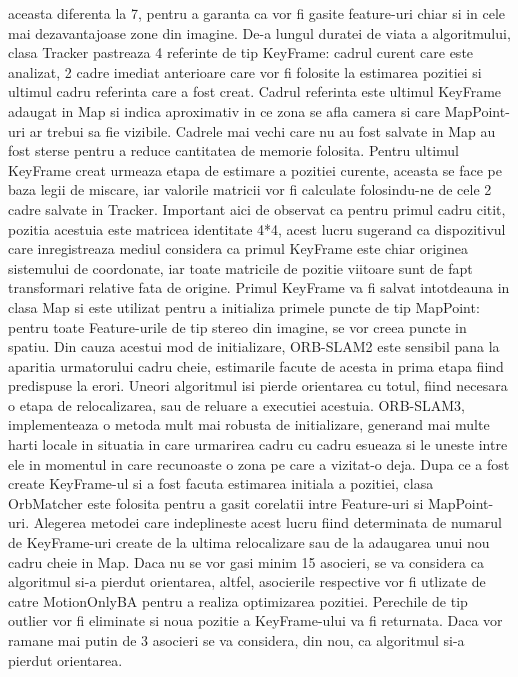 \documentclass[12pt,a4paper]{report}
\begin{document}
aceasta diferenta la 7, pentru a garanta ca vor fi gasite feature-uri chiar si in cele mai 
dezavantajoase zone din imagine. De-a lungul duratei de viata a algoritmului, clasa 
Tracker pastreaza 4 referinte de tip KeyFrame: cadrul curent care este analizat, 2 cadre imediat 
anterioare care vor fi folosite la estimarea pozitiei si ultimul cadru referinta care a fost creat.
Cadrul referinta este ultimul KeyFrame adaugat in Map si indica aproximativ in ce 
zona se afla camera si care MapPoint-uri ar trebui sa fie vizibile. Cadrele mai vechi care nu au 
fost salvate in Map au fost sterse pentru a reduce cantitatea de memorie folosita. Pentru ultimul
KeyFrame creat urmeaza etapa de estimare a pozitiei curente, aceasta se face pe baza legii 
de miscare, iar valorile matricii vor fi calculate folosindu-ne de cele 2 cadre salvate in Tracker.
Important aici de observat ca pentru primul cadru citit, pozitia acestuia este matricea identitate
4*4, acest lucru sugerand ca dispozitivul care inregistreaza mediul considera ca primul KeyFrame
este chiar originea sistemului de coordonate, iar toate matricile de pozitie viitoare sunt de fapt
transformari relative fata de origine. Primul KeyFrame va fi salvat intotdeauna in clasa Map si 
este utilizat pentru a initializa primele puncte de tip MapPoint: pentru toate Feature-urile de 
tip stereo din imagine, se vor creea puncte in spatiu. Din cauza acestui mod de initializare, 
ORB-SLAM2 este sensibil pana la aparitia urmatorului cadru cheie, estimarile facute de acesta 
in prima etapa fiind predispuse la erori. Uneori algoritmul isi pierde orientarea cu totul, fiind
necesara o etapa de relocalizarea, sau de reluare a executiei acestuia. ORB-SLAM3, implementeaza 
o metoda mult mai robusta de initializare, generand mai multe harti locale in situatia in care
urmarirea cadru cu cadru esueaza si le uneste intre ele in momentul in care recunoaste o zona pe 
care a vizitat-o deja. Dupa ce a fost create KeyFrame-ul si a fost facuta estimarea initiala a 
pozitiei, clasa OrbMatcher este folosita pentru a gasit corelatii intre Feature-uri si MapPoint-uri.
Alegerea metodei care indeplineste acest lucru fiind determinata de numarul de KeyFrame-uri 
create de la ultima relocalizare sau de la adaugarea unui nou cadru cheie in Map. Daca nu se 
vor gasi minim 15 asocieri, se va considera ca algoritmul si-a pierdut orientarea, altfel, 
asocierile respective vor fi utlizate de catre MotionOnlyBA pentru a realiza optimizarea pozitiei.
Perechile de tip outlier vor fi eliminate si noua pozitie a KeyFrame-ului va fi returnata. Daca 
vor ramane mai putin de 3 asocieri se va considera, din nou, ca algoritmul si-a pierdut orientarea.
\end{document}
